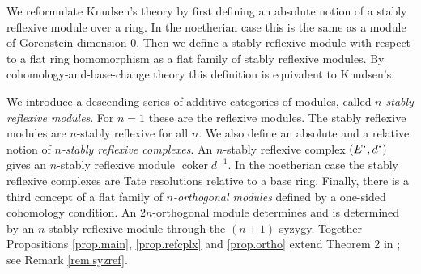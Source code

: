 \documentclass[a4paper,10pt]{amsart}
\theoremstyle{plain}
\theoremstyle{definition}
\theoremstyle{remark}
\numberwithin{equation}{xx}
\DeclareMathOperator{\coker}{coker}
\newcommand\bdot{\ensuremath{%
  \mathchoice%
   {\mskip\thinmuskip\lower0.2ex\hbox{\scalebox{1.5}{$\cdot$}}\mskip\thinmuskip}}%
   {\mskip\thinmuskip\lower0.2ex\hbox{\scalebox{1.5}{$\cdot$}}\mskip\thinmuskip}%
   {\lower0.3ex\hbox{\scalebox{1.2}{$\cdot$}}}%
   {\lower0.3ex\hbox{\scalebox{1.2}{$\cdot$}}}%
}
\begin{document}
We reformulate Knudsen's theory by first defining an absolute notion of a stably reflexive module over a ring. In the noetherian case this is the same as a module of Gorenstein dimension \(0\). Then we define a stably reflexive module with respect to a flat ring homomorphism as a flat family of stably reflexive modules. By cohomology-and-base-change theory this definition is equivalent to Knudsen's.

We introduce a descending series of additive categories of modules, called \emph{\(n\)-stably reflexive modules}. For \(n=1\) these are the reflexive modules. The stably reflexive modules are \(n\)-stably reflexive for all \(n\). We also define an absolute and a relative notion of \emph{\(n\)-stably reflexive complexes}. An \(n\)-stably reflexive complex \((E^{\bdot},d^{\bdot})\) gives an \(n\)-stably reflexive module \(\coker d^{-1}\). In the noetherian case the stably reflexive complexes are Tate resolutions relative to a base ring. Finally, there is a third concept of a flat family of  \emph{\(n\)-orthogonal  modules} defined by a one-sided cohomology condition. An \(2n\)-orthogonal  module determines and is determined by an \(n\)-stably reflexive module  through the \((n{+}1)\)-syzygy. Together Propositions \ref{prop.main}, \ref{prop.refcplx} and \ref{prop.ortho} extend Theorem 2 in \cite[Appendix]{knu:83a}; see Remark \ref{rem.syzref}.
\end{document}
